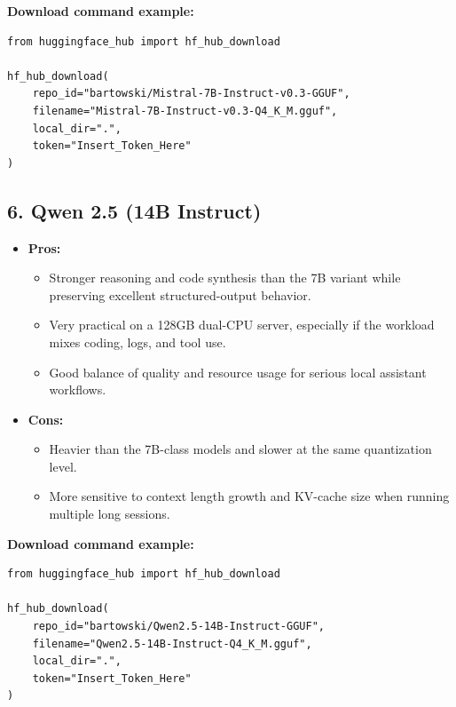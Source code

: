 \documentclass{article}
\begin{document}
\noindent\textbf{Download command example:}
\begin{verbatim}
from huggingface_hub import hf_hub_download

hf_hub_download(
    repo_id="bartowski/Mistral-7B-Instruct-v0.3-GGUF",
    filename="Mistral-7B-Instruct-v0.3-Q4_K_M.gguf",
    local_dir=".",
    token="Insert_Token_Here"
)
\end{verbatim}

\subsection*{6. Qwen 2.5 (14B Instruct)}
\begin{itemize}
    \item \textbf{Pros:}
    \begin{itemize}
        \item Stronger reasoning and code synthesis than the 7B variant while preserving excellent structured-output behavior.
        \item Very practical on a 128GB dual-CPU server, especially if the workload mixes coding, logs, and tool use.
        \item Good balance of quality and resource usage for serious local assistant workflows.
    \end{itemize}
    \item \textbf{Cons:}
    \begin{itemize}
        \item Heavier than the 7B-class models and slower at the same quantization level.
        \item More sensitive to context length growth and KV-cache size when running multiple long sessions.
    \end{itemize}
\end{itemize}

\noindent\textbf{Download command example:}
\begin{verbatim}
from huggingface_hub import hf_hub_download

hf_hub_download(
    repo_id="bartowski/Qwen2.5-14B-Instruct-GGUF",
    filename="Qwen2.5-14B-Instruct-Q4_K_M.gguf",
    local_dir=".",
    token="Insert_Token_Here"
)
\end{verbatim}
\end{document}
